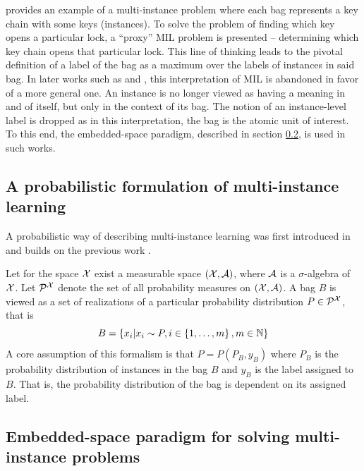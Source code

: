 \cite{dietterich_solving_1997} provides an example of a multi-instance problem where each bag represents a key chain with some keys (instances). To solve the problem of finding which key opens a particular lock, a \enquote{proxy} MIL problem is presented -- determining which key chain opens that particular lock. This line of thinking leads to the pivotal definition of a label of the bag as a maximum over the labels of instances in said bag. In later works such as \cite{pevny_using_2017} and \cite{dedic_hierarchicke_2017}, this interpretation of MIL is abandoned in favor of a more general one. An instance is no longer viewed as having a meaning in and of itself, but only in the context of its bag. The notion of an instance-level label is dropped as in this interpretation, the bag is the atomic unit of interest. To this end, the embedded-space paradigm, described in section \ref{sec:embedded-space-paradigm}, is used in such works.

\subsection{A probabilistic formulation of multi-instance learning}\label{sec:probabilistic-formalism}
A probabilistic way of describing multi-instance learning was first introduced in \cite{pevny_using_2017} and builds on the previous work \cite{muandet_learning_2012}.

Let for the space \( \mathcal{X} \) exist a measurable space \( \left( \mathcal{X}, \mathcal{A} \right) \), where \( \mathcal{A} \) is a \( \sigma \)-algebra of \( \mathcal{X} \). Let \( \mathcal{P}^\mathspace{X} \) denote the set of all probability measures on \( \left( \mathcal{X}, \mathcal{A} \right) \). A bag \( B \) is viewed as a set of realizations of a particular probability distribution \( P \in \mathcal{P}^\mathspace{X} \), that is
\[ B = \left\{ x_i \middle| x_i \sim P, i \in \left\{ 1, \dots, m \right\}, m \in \mathbb{N} \right\} \]
A core assumption of this formalism is that \( P = P \left( P_B, y_B \right) \) where \( P_B \) is the probability distribution of instances in the bag \( B \) and \( y_B \) is the label assigned to \( B \). That is, the probability distribution of the bag is dependent on its assigned label.

\subsection{Embedded-space paradigm for solving multi-instance problems}\label{sec:embedded-space-paradigm}

